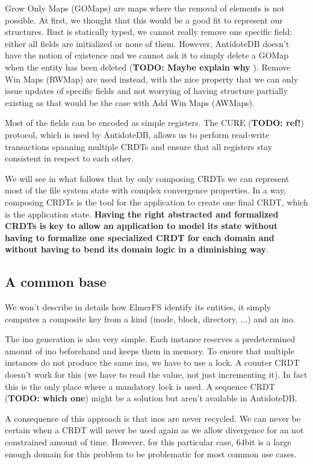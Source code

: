 \documentclass[sigplan, 10pt]{acmart}
\begin{document}
Grow Only Maps (GOMaps) are maps where the removal of elements is not possible.
At first, we thought that this would be a good fit to represent
our structures. Rust is statically typed, we cannot really remove one specific
field: either all fields are initialized or none of them. However, AntidoteDB
doesn't have the notion of existence and we cannot ask it to simply delete
a GOMap when the entity has been deleted (\textbf{TODO: Maybe explain why }).
Remove Win Maps (RWMap) are used instead, with the nice property that
we can only issue updates of specific fields and not worrying of
having structure partially existing as that would be the case
with Add Win Maps (AWMaps).

Most of the fields can be encoded as simple registers. The CURE (\textbf{TODO: ref!})
protocol, which is used by AntidoteDB, allows us to
perform read-write transactions spanning multiple CRDTs and ensure
that all registers stay consistent in respect to each other.

We will see in what follows that by only composing CRDTs we can represent
most of the file system state with complex convergence properties. In a way,
composing CRDTs is the tool for the application to create one final CRDT, which
is the application state. \textbf{Having the right abstracted and formalized CRDTs is
key to allow an application to model its state without having to
formalize one specialized CRDT for each domain and without having to bend
its domain logic in a diminishing way}.

\subsection{A common base}

We won't describe in details how ElmerFS identify its entities,
it simply computes a composite key from a kind
(inode, block, directory, ...) and an ino.

The ino generation is also very simple. Each instance reserves a predetermined
amount of ino beforehand and keeps them in memory. To ensure that multiple
instances do not produce the same ino, we have to use a lock. A counter CRDT
doesn't work for this (we have to read the value, not just incrementing it). In fact
this is the only place where a mandatory lock is used.
A sequence CRDT (\textbf{TODO: which one}) might be a solution but aren't available in
AntidoteDB.

A consequence of this approach is that inos are never recycled. We can never
be certain when a CRDT will never be used again as we allow divergence for an
not constrained amount of time. However, for this particular case, 64bit is a
large enough domain for this problem to be problematic for most common use
cases.
\end{document}
